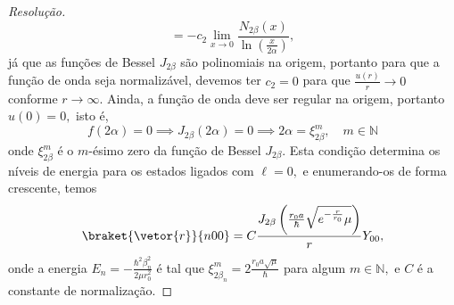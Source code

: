 \begin{proof}[Resolução]
\begin{equation*}
        = -c_2\lim_{x\to0}{\frac{N_{2 \beta}(x)}{\ln\left(\frac{x}{2\alpha}\right)}},
    \end{equation*}
    já que as funções de Bessel \(J_{2\beta}\) são polinomiais na origem, portanto para que a função de onda seja normalizável, devemos ter \(c_2 = 0\) para que \(\frac{u(r)}{r} \to 0\) conforme \(r \to \infty.\) Ainda, a função de onda deve ser regular na origem, portanto \(u(0) = 0,\) isto é,
    \begin{equation*}
        f(2\alpha) = 0 \implies J_{2\beta}(2 \alpha) = 0 \implies 2\alpha = \xi^m_{2\beta}, \quad m \in \mathbb{N}
    \end{equation*}
    onde \(\xi^m_{2 \beta}\) é o \(m\)-ésimo zero da função de Bessel \(J_{2\beta}\). Esta condição determina os níveis de energia para os estados ligados com \(\ell = 0,\) e enumerando-os de forma crescente, temos
    \begin{equation*}
        \braket{\vetor{r}}{n00} = C\frac{J_{2\beta}\left(\frac{r_0 a}{\hbar}\sqrt{e^{-\frac{r}{r_0}}\mu}\right)}{r}Y_{00},
    \end{equation*}
    onde a energia \(E_n = -\frac{\hbar^2 \beta_n^2}{2\mu r_0^2}\) é tal que \(\xi^m_{2 \beta_n} = 2\frac{r_0 a \sqrt{\mu}}{\hbar}\) para algum \(m \in \mathbb{N},\) e \(C\) é a constante de normalização.
\end{proof}
